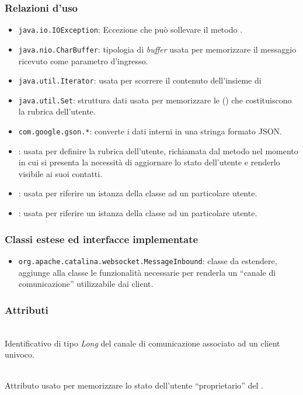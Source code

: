 \subsubsection*{Relazioni d'uso}
\begin{itemize}
	\item \texttt{java.io.IOException}: Eccezione che può sollevare il metodo .
	\item \texttt{java.nio.CharBuffer}: tipologia di \textit{buffer} usata per memorizzare il messaggio ricevuto come parametro d'ingresso.
	\item \texttt{java.util.Iterator}: usata per scorrere il contenuto dell'insieme di 
	\item \texttt{java.util.Set}: struttura dati usata per memorizzare le  () che costituiscono la rubrica dell'utente.
	\item \texttt{com.google.gson.*}: converte i dati interni in una stringa formato JSON.
	
	\item {}: usata per definire la rubrica dell'utente, richiamata dal metodo  nel momento in cui si presenta la necessità di aggiornare lo stato dell'utente e renderlo visibile ai suoi contatti.
	\item {}: usata per riferire un istanza della classe ad un particolare utente.
	\item {}: usata per riferire un istanza della classe ad un particolare utente.

\end{itemize}

\subsubsection*{Classi estese ed interfacce implementate}
\begin{itemize}
	\item \texttt{org.apache.catalina.websocket.MessageInbound}: classe da estendere, aggiunge alla classe  le funzionalità necessarie per renderla un ``canale di comunicazione'' utilizzabile dai client.
\end{itemize}

\subsubsection*{Attributi}
\begin{description}
  \item{}\\
  Identificativo di tipo \textit{Long} del canale di comunicazione associato ad un client univoco.
  \item{}\\
  Attributo usato per memorizzare lo stato dell'utente ``proprietario'' del .
\end{description}


